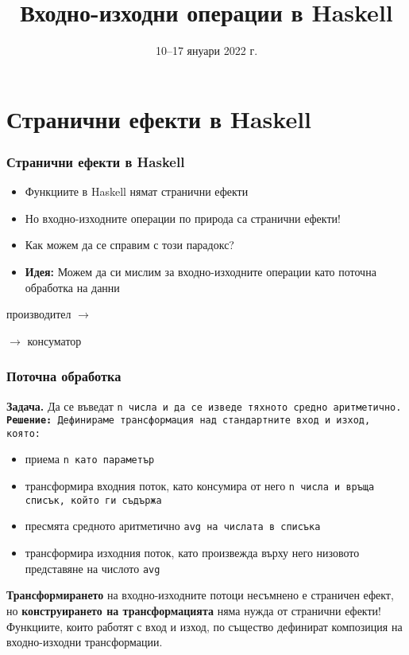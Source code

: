 \documentclass[alsotrans]{beamerswitch}
\title{Входно-изходни операции в Haskell}
\date{10--17 януари 2022 г.}
\begin{document}
\begin{frame}
  \titlepage
\end{frame}

\section{Странични ефекти в Haskell}

\begin{frame}
  \frametitle{Странични ефекти в Haskell}

  \begin{itemize}[<+->]
  \item Функциите в Haskell нямат странични ефекти
  \item Но входно-изходните операции по природа са странични ефекти!
  \item Как можем да се справим с този парадокс?
  \item \textbf{Идея:} Можем да си мислим за входно-изходните операции като поточна обработка на данни
  \end{itemize}
  \onslide<+->
  \begin{center}
    производител
    $\longrightarrow$
     $\longrightarrow$ консуматор
  \end{center}
\end{frame}

\begin{frame}
  \frametitle{Поточна обработка}
  \textbf{Задача.} Да се въведат \tt{n} числа и да се изведе тяхното средно аритметично.\\
  \pause
  \textbf{Решение:} Дефинираме трансформация над стандартните вход и изход, която:
  \begin{itemize}[<+->]
  \item приема \tt{n} като параметър
  \item трансформира входния поток, като \alert{консумира} от него \tt{n} числа и връща списък, който ги съдържа
  \item пресмята средното аритметично \tt{avg} на числата в списъка
  \item трансформира изходния поток, като \alert{произвежда} върху него низовото представяне на числото \tt{avg}
  \end{itemize}
  \onslide<+->
  \textbf{Трансформирането} на входно-изходните потоци несъмнено е страничен ефект, но \textbf{конструирането на трансформацията} няма нужда от странични ефекти!\\
  \onslide<+->
  \alert{Функциите, които работят с вход и изход, по същество дефинират композиция на входно-изходни трансформации.}
\end{frame}
\end{document}
